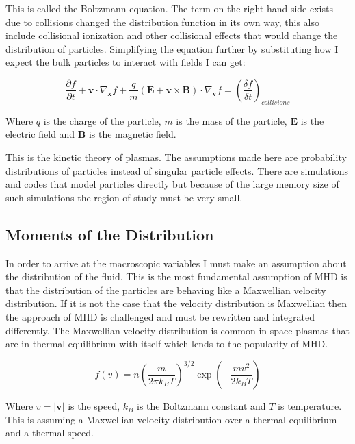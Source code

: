\documentclass[12pt,upcase]{umlthesis}
\begin{document}
This is called the Boltzmann equation. The term on the right hand side exists due to collisions changed the distribution function in its own way, this also include collisional ionization and other collisional effects that would change the distribution of particles. Simplifying the equation further by substituting how I expect the bulk particles to interact with fields I can get:

\begin{equation}
	\frac{\partial f}{\partial t} + \textbf{v} \cdot \nabla_{\textbf{x}} f + \frac{q}{m} (\textbf{E} + \textbf{v} \times \textbf{B}) \cdot \nabla_{\textbf{v}} f = {(\frac{\delta f}{\delta t})}_{collisions}
\end{equation}

Where $q$ is the charge of the particle, $m$ is the mass of the particle, $\textbf{E}$ is the electric field and $\textbf{B}$ is the magnetic field.

This is the kinetic theory of plasmas. The assumptions made here are probability distributions of particles instead of singular particle effects. There are simulations and codes that model particles directly but because of the large memory size of such simulations the region of study must be very small. 

\subsection{Moments of the Distribution}\label{sec:moments}

In order to arrive at the macroscopic variables I must make an assumption about the distribution of the fluid. This is the most fundamental assumption of MHD is that the distribution of the particles are behaving like a Maxwellian velocity distribution. If it is not the case that the velocity distribution is Maxwellian then the approach of MHD is challenged and must be rewritten and integrated differently. The Maxwellian velocity distribution is common in space plasmas that are in thermal equilibrium with itself which lends to the popularity of MHD\@.

\begin{equation}
	f(v) = n {(\frac{m}{2\pi k_B T})}^{3/2} \exp{(-\frac{mv^2}{2k_B T})}
\end{equation}

Where $v = |\textbf{v}|$ is the speed, $k_B$ is the Boltzmann constant and $T$ is temperature. This is assuming a Maxwellian velocity distribution over a thermal equilibrium and a thermal speed.
\end{document}
